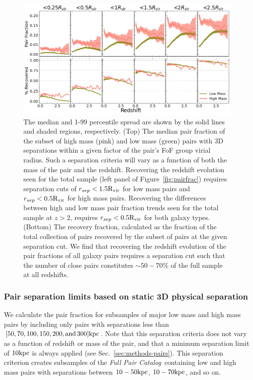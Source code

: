 \documentclass[twocolumn]{aastex631}
\newcommand{\paircat}{\textit{Full Pair Catalog}}
\newcommand{\Rvir}{\ensuremath{\rm R_{vir}}}
\begin{document}
    \begin{figure}[htp]
        \centering
        \includegraphics[width=\textwidth]{pairfrac_vircut.png}
        \caption{\label{fig:vircut}The median and 1-99 percentile spread are shown by the solid lines and shaded regions, respectively. 
        (Top) The median pair fraction of the subset of high mass (pink) and low mass (green) pairs with 3D separations within a given factor of the pair's FoF group virial radius.
        Such a separation criteria will vary as a function of both the mass of the pair and the redshift. 
        Recovering the redshift evolution seen for the total sample (left panel of Figure~\ref{fig:pairfrac}) requires separation cuts of $r_{sep} < 1.5\Rvir$ for low mass pairs and $r_{sep} < 0.5\Rvir$ for high mass pairs. 
        Recovering the differences between high and low mass pair fraction trends seen for the total sample at $z>2$, requires $r_{sep} < 0.5\Rvir$ for both galaxy types. 
        (Bottom) The recovery fraction, calculated as the fraction of the total collection of pairs recovered by the subset of pairs at the given separation cut. 
        We find that recovering the redshift evolution of the pair fractions of all galaxy pairs requires a separation cut such that the number of close pairs constitutes $\sim50-70\%$ of the full sample at all redshifts.
    }
    \end{figure}

\subsubsection{Pair separation limits based on static 3D physical separation} \label{sec:results-frac-sepcut}
    We calculate the pair fraction for subsamples of major low mass and high mass pairs by including only pairs with separations less than $[50,70,100,150,200,\mathrm{and\, }300]\mathrm{kpc}$.  
    Note that this separation criteria does not vary as a function of redshift or mass of the pair, and that a minimum separation limit of $10\mathrm{kpc}$ is always applied (see Sec.~\ref{sec:methods-pairs}).
    This separation criterion creates subsamples of the \paircat\ containing low and high mass pairs with separations between $10-50\mathrm{kpc}$, $10-70\mathrm{kpc}$, and so on. 
\end{document}
